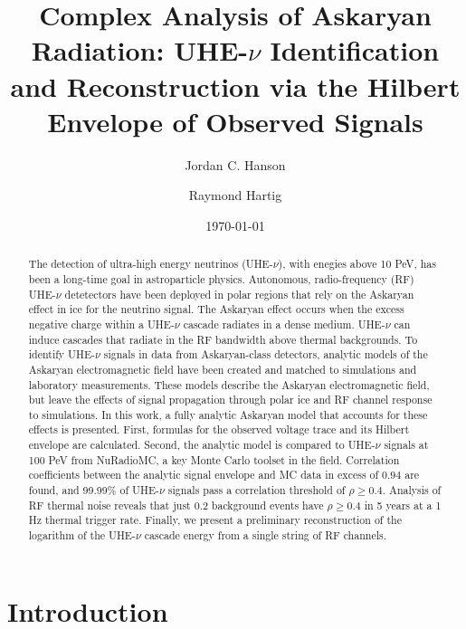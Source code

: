 \documentclass[amsmath,amssymb,aps,prd,10pt,twocolumn,showkeys]{revtex4}
\begin{document}
\title{Complex Analysis of Askaryan Radiation: UHE-$\nu$ Identification and Reconstruction via the Hilbert Envelope of Observed Signals}

\author{Jordan C. Hanson}
\author{Raymond Hartig}
\date{\today}

\begin{abstract}
The detection of ultra-high energy neutrinos (UHE-$\nu$), with enegies above 10 PeV, has been a long-time goal in astroparticle physics.  Autonomous, radio-frequency (RF) UHE-$\nu$ detetectors have been deployed in polar regions that rely on the Askaryan effect in ice for the neutrino signal.  The Askaryan effect occurs when the excess negative charge within a UHE-$\nu$ cascade radiates in a dense medium.  UHE-$\nu$ can induce cascades that radiate in the RF bandwidth above thermal backgrounds.  To identify UHE-$\nu$ signals in data from Askaryan-class detectors, analytic models of the Askaryan electromagnetic field have been created and matched to simulations and laboratory measurements.  These models describe the Askaryan electromagnetic field, but leave the effects of signal propagation through polar ice and RF channel response to simulations.  In this work, a fully analytic Askaryan model that accounts for these effects is presented.  First, formulas for the observed voltage trace and its Hilbert envelope are calculated.  Second, the analytic model is compared to UHE-$\nu$ signals at 100 PeV from NuRadioMC, a key Monte Carlo toolset in the field.  Correlation coefficients between the analytic signal envelope and MC data in excess of $0.94$ are found, and 99.99\% of UHE-$\nu$ signals pass a correlation threshold of $\rho\geq 0.4$.  Analysis of RF thermal noise reveals that just 0.2 background events have $\rho\geq 0.4$ in 5 years at a 1 Hz thermal trigger rate.  Finally, we present a preliminary reconstruction of the logarithm of the UHE-$\nu$ cascade energy from a single string of RF channels.
\end{abstract}


\maketitle

\section{Introduction}
\label{sec:int}
\end{document}
